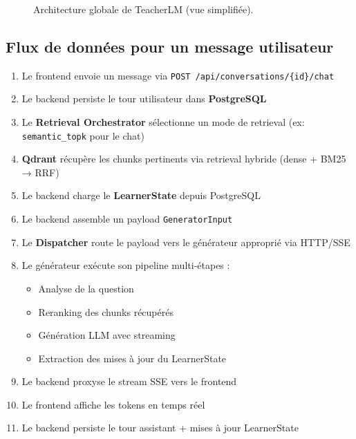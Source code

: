 \documentclass[12pt,a4paper]{article}
\begin{document}
\begin{figure}[H]
    \caption{Architecture globale de TeacherLM (vue simplifiée).}
\end{figure}

\subsection{Flux de données pour un message utilisateur}

\begin{enumerate}
    \item Le frontend envoie un message via \texttt{POST /api/conversations/\{id\}/chat}
    \item Le backend persiste le tour utilisateur dans \textbf{PostgreSQL}
    \item Le \textbf{Retrieval Orchestrator} sélectionne un mode de retrieval (ex: \texttt{semantic\_topk} pour le chat)
    \item \textbf{Qdrant} récupère les chunks pertinents via retrieval hybride (dense + BM25 → RRF)
    \item Le backend charge le \textbf{LearnerState} depuis PostgreSQL
    \item Le backend assemble un payload \texttt{GeneratorInput}
    \item Le \textbf{Dispatcher} route le payload vers le générateur approprié via HTTP/SSE
    \item Le générateur exécute son pipeline multi-étapes :
        \begin{itemize}
            \item Analyse de la question
            \item Reranking des chunks récupérés
            \item Génération LLM avec streaming
            \item Extraction des mises à jour du LearnerState
        \end{itemize}
    \item Le backend proxyse le stream SSE vers le frontend
    \item Le frontend affiche les tokens en temps réel
    \item Le backend persiste le tour assistant + mises à jour LearnerState
\end{enumerate}
\end{document}
